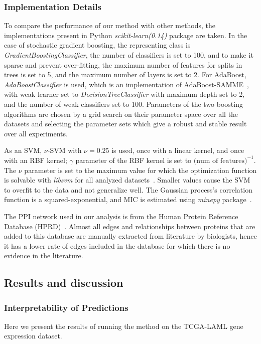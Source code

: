 \subsubsection{Implementation Details}
To compare the performance of our method with other methods, the implementations present in Python \emph{scikit-learn(0.14)} package are taken. In the case of stochastic gradient boosting, the representing class is \emph{GradientBoostingClassifier}, the number of classifiers is set to 100, and to make it sparse and prevent over-fitting, the maximum number of features for splits in trees is set to 5, and the maximum number of layers is set to 2.
For AdaBoost, \emph{AdaBoostClassifier} is used, which is an implementation of AdaBoost-SAMME~\cite{zhu2009multi}, with weak learner set to \emph{DecisionTreeClassifier} with maximum depth set to 2, and the number of weak classifiers set to 100. Parameters of the two boosting algorithms are chosen by a grid search on their parameter space over all the datasets and selecting the parameter sets which give a robust and stable result over all experiments.

As an SVM, $\nu$-SVM with $\nu = 0.25$ is used, once with a linear kernel, and once with an RBF kernel; $\gamma$ parameter of the RBF kernel is set to $\textrm{(num of features)}^{-1}$. The $\nu$ parameter is set to the maximum value for which the optimization function is solvable with \emph{libsvm} for all analyzed datasets~\cite{CC01a}. Smaller values cause the SVM to overfit to the data and not generalize well.
The Gaussian process's correlation function is a squared-exponential, and MIC is estimated using \emph{minepy} package~\cite{albanese2013minerva}.

The PPI network used in our analysis is from the Human Protein Reference Database (HPRD)~\cite{peri2003development}. Almost all edges and relationships between proteins that are added to this database are manually extracted from literature by biologists, hence it has a lower rate of edges included in the database for which there is no evidence in the literature.


\subsection{Results and discussion}
\subsubsection{Interpretability of Predictions}
Here we present the results of running the method on the TCGA-LAML gene expression dataset.

